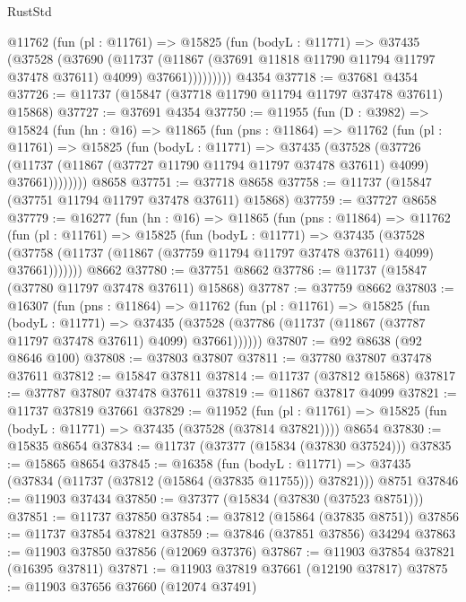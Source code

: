 \begin{lexlean}{RustStd}
\begin{coremodule}
          @11762
            (fun (pl : @11761) =>
            @15825
              (fun (bodyL : @11771) =>
              @37435
                (@37528
                  (@37690
                    (@11737
                      (@11867 (@37691 @11818 @11790 @11794 @11797 @37478 @37611) @4099)
                      @37661)))))))))
    @4354
@37718 := @37681 @4354
@37726 := @11737 (@15847 (@37718 @11790 @11794 @11797 @37478 @37611) @15868)
@37727 := @37691 @4354
@37750 := @11955
    (fun (D : @3982) =>
    @15824
      (fun (hn : @16) =>
      @11865
        (fun (pns : @11864) =>
        @11762
          (fun (pl : @11761) =>
          @15825
            (fun (bodyL : @11771) =>
            @37435
              (@37528
                (@37726
                  (@11737 (@11867 (@37727 @11790 @11794 @11797 @37478 @37611) @4099) @37661))))))))
    @8658
@37751 := @37718 @8658
@37758 := @11737 (@15847 (@37751 @11794 @11797 @37478 @37611) @15868)
@37759 := @37727 @8658
@37779 := @16277
    (fun (hn : @16) =>
    @11865
      (fun (pns : @11864) =>
      @11762
        (fun (pl : @11761) =>
        @15825
          (fun (bodyL : @11771) =>
          @37435
            (@37528
              (@37758 (@11737 (@11867 (@37759 @11794 @11797 @37478 @37611) @4099) @37661)))))))
    @8662
@37780 := @37751 @8662
@37786 := @11737 (@15847 (@37780 @11797 @37478 @37611) @15868)
@37787 := @37759 @8662
@37803 := @16307
    (fun (pns : @11864) =>
    @11762
      (fun (pl : @11761) =>
      @15825
        (fun (bodyL : @11771) =>
        @37435 (@37528 (@37786 (@11737 (@11867 (@37787 @11797 @37478 @37611) @4099) @37661))))))
@37807 := @92 @8638 (@92 @8646 @100)
@37808 := @37803 @37807
@37811 := @37780 @37807 @37478 @37611
@37812 := @15847 @37811
@37814 := @11737 (@37812 @15868)
@37817 := @37787 @37807 @37478 @37611
@37819 := @11867 @37817 @4099
@37821 := @11737 @37819 @37661
@37829 := @11952
    (fun (pl : @11761) => @15825 (fun (bodyL : @11771) => @37435 (@37528 (@37814 @37821))))
    @8654
@37830 := @15835 @8654
@37834 := @11737 (@37377 (@15834 (@37830 @37524)))
@37835 := @15865 @8654
@37845 := @16358
    (fun (bodyL : @11771) => @37435 (@37834 (@11737 (@37812 (@15864 (@37835 @11755))) @37821)))
    @8751
@37846 := @11903 @37434
@37850 := @37377 (@15834 (@37830 (@37523 @8751)))
@37851 := @11737 @37850
@37854 := @37812 (@15864 (@37835 @8751))
@37856 := @11737 @37854 @37821
@37859 := @37846 (@37851 @37856) @34294
@37863 := @11903 @37850 @37856 (@12069 @37376)
@37867 := @11903 @37854 @37821 (@16395 @37811)
@37871 := @11903 @37819 @37661 (@12190 @37817)
@37875 := @11903 @37656 @37660 (@12074 @37491)

\end{coremodule}
\end{lexlean}
